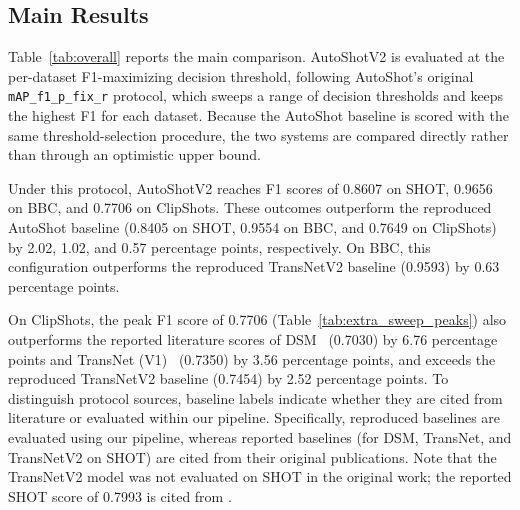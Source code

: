 \subsection{Main Results}
\label{subsec:main_results}

Table~\ref{tab:overall} reports the main comparison. AutoShotV2 is evaluated at the per-dataset F1-maximizing decision threshold, following AutoShot's original \texttt{mAP\_f1\_p\_fix\_r} protocol, which sweeps a range of decision thresholds and keeps the highest F1 for each dataset. Because the AutoShot baseline is scored with the same threshold-selection procedure, the two systems are compared directly rather than through an optimistic upper bound.

Under this protocol, AutoShotV2 reaches F1 scores of 0.8607 on SHOT, 0.9656 on BBC, and 0.7706 on ClipShots. These outcomes outperform the reproduced AutoShot baseline (0.8405 on SHOT, 0.9554 on BBC, and 0.7649 on ClipShots) by 2.02, 1.02, and 0.57 percentage points, respectively. On BBC, this configuration outperforms the reproduced TransNetV2 baseline (0.9593) by 0.63 percentage points.

On ClipShots, the peak F1 score of 0.7706 (Table~\ref{tab:extra_sweep_peaks}) also outperforms the reported literature scores of DSM~\cite{tang2018clipshots} (0.7030) by 6.76 percentage points and TransNet (V1)~\cite{soucek2019transnet} (0.7350) by 3.56 percentage points, and exceeds the reproduced TransNetV2 baseline (0.7454) by 2.52 percentage points. To distinguish protocol sources, baseline labels indicate whether they are cited from literature or evaluated within our pipeline. Specifically, reproduced baselines are evaluated using our pipeline, whereas reported baselines (for DSM, TransNet, and TransNetV2 on SHOT) are cited from their original publications. Note that the TransNetV2 model was not evaluated on SHOT in the original work; the reported SHOT score of 0.7993 is cited from \cite{zhu2023autoshot}.

\begin{table}[!t]
\caption{F1 Score Comparison Across Evaluation Datasets}
\label{tab:overall}
\centering
\small
\renewcommand{\arraystretch}{1.08}
\vspace{0.5ex}
\end{table}

